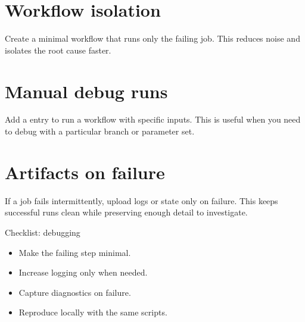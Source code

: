 \section{Workflow isolation}
Create a minimal workflow that runs only the failing job.
This reduces noise and isolates the root cause faster.

\section{Manual debug runs}
Add a  entry to run a workflow with specific inputs.
This is useful when you need to debug with a particular branch or parameter set.

\section{Artifacts on failure}
If a job fails intermittently, upload logs or state only on failure.
This keeps successful runs clean while preserving enough detail to investigate.

\begin{checklistbox}{Checklist: debugging}
\begin{itemize}[nosep]
  \item Make the failing step minimal.
  \item Increase logging only when needed.
  \item Capture diagnostics on failure.
  \item Reproduce locally with the same scripts.
\end{itemize}
\end{checklistbox}
